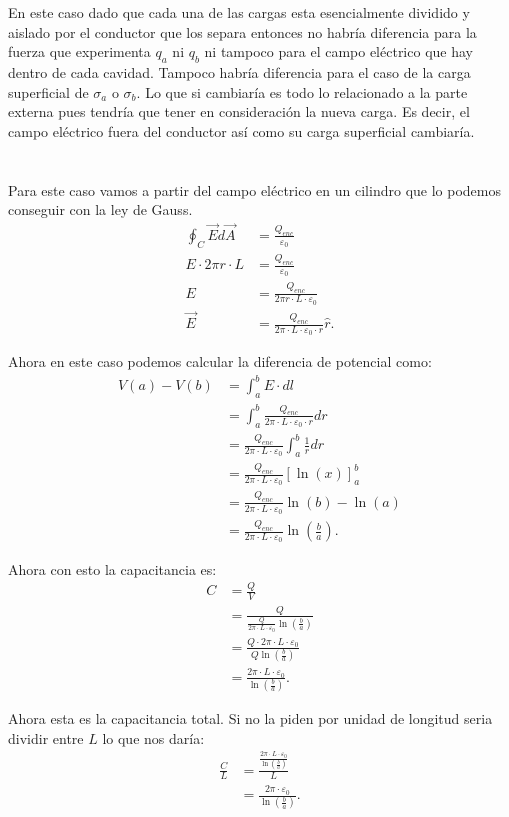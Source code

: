 \documentclass{report}
\begin{document}
En este caso dado que cada una de las cargas esta esencialmente dividido y aislado por el conductor que los separa entonces no habría diferencia para la fuerza que experimenta $q_a$ ni $q_b$ ni tampoco para el campo eléctrico que hay dentro de cada cavidad. Tampoco habría diferencia para el caso de la carga superficial de $\sigma_a$ o $\sigma_b$. Lo que si cambiaría es todo lo relacionado a la parte externa pues tendría que tener en consideración la nueva carga. Es decir, el campo eléctrico fuera del conductor así como su carga superficial cambiaría.

\chapter{}

Para este caso vamos a partir del campo eléctrico en un cilindro que lo podemos conseguir con la ley de Gauss.
\begin{align*}
  \oint_{C} \vec{E} d\vec{A} &= \frac{Q_{enc}}{\varepsilon_0} \\
  E \cdot 2\pi r \cdot L &= \frac{Q_{enc}}{\varepsilon_0} \\
  E &= \frac{Q_{enc}}{2\pi r \cdot L \cdot \varepsilon_0} \\
  \vec{E} &= \frac{Q_{enc}}{2\pi\cdot L \cdot \varepsilon_0 \cdot r} \hat{r}
.\end{align*}

Ahora en este caso podemos calcular la diferencia de potencial como:
\begin{align*}
  V\left( a \right) - V\left( b \right) &= \int_{a}^{b} E\cdot dl \\
  &= \int_{a}^{b} \frac{Q_{enc}}{2\pi\cdot L \cdot \varepsilon_0 \cdot r} dr\\
  &= \frac{Q_{enc}}{2\pi\cdot L \cdot \varepsilon_0}\int_{a}^{b} \frac{1}{r} dr\\
  &= \frac{Q_{enc}}{2\pi\cdot L \cdot \varepsilon_0} \left[ \ln(x) \right]_{a}^{b}\\
  &= \frac{Q_{enc}}{2\pi\cdot L \cdot \varepsilon_0} \ln(b) - \ln(a)\\
  &= \frac{Q_{enc}}{2\pi\cdot L \cdot \varepsilon_0} \ln\left( \frac{b}{a} \right)
.\end{align*}

Ahora con esto la capacitancia es:
\begin{align*}
  C &= \frac{Q}{V} \\
  &= \frac{Q}{\frac{Q}{2\pi\cdot L \cdot \varepsilon_0} \ln\left( \frac{b}{a} \right)} \\
  &= \frac{Q \cdot 2\pi\cdot L \cdot \varepsilon_0}{Q \ln\left( \frac{b}{a} \right)} \\
  &= \frac{2\pi\cdot L \cdot \varepsilon_0}{\ln\left( \frac{b}{a} \right)}
.\end{align*}

Ahora esta es la capacitancia total. Si no la piden por unidad de longitud seria dividir entre $L$ lo que nos daría:
 \begin{align*}
  \frac{C}{L} &= \frac{\frac{2\pi\cdot L \cdot \varepsilon_0}{\ln\left( \frac{b}{a} \right)}}{L}  \\
   &= \frac{2\pi \cdot \varepsilon_0}{\ln\left( \frac{b}{a} \right)} 
.\end{align*}
\end{document}
